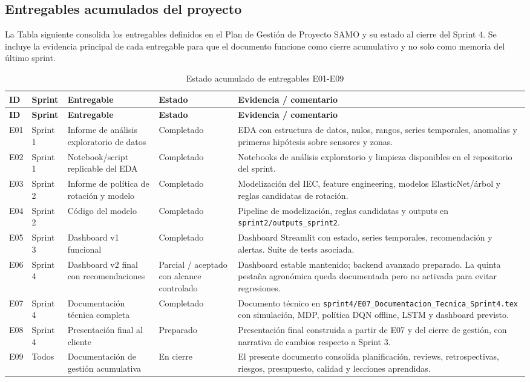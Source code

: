 \documentclass[11pt,a4paper]{article}
\begin{document}
\subsection{Entregables acumulados del proyecto}

La Tabla siguiente consolida los entregables definidos en el Plan de Gestión de Proyecto SAMO y su estado al cierre del Sprint 4. Se incluye la evidencia principal de cada entregable para que el documento funcione como cierre acumulativo y no solo como memoria del último sprint.

\begin{longtable}{p{}p{}p{}p{}p{}}
\caption{Estado acumulado de entregables E01-E09}\\
\toprule
\textbf{ID} & \textbf{Sprint} & \textbf{Entregable} & \textbf{Estado} & \textbf{Evidencia / comentario} \\
\midrule
\endfirsthead
\toprule
\textbf{ID} & \textbf{Sprint} & \textbf{Entregable} & \textbf{Estado} & \textbf{Evidencia / comentario} \\
\midrule
\endhead
E01 & Sprint 1 & Informe de análisis exploratorio de datos & Completado & EDA con estructura de datos, nulos, rangos, series temporales, anomalías y primeras hipótesis sobre sensores y zonas. \\
E02 & Sprint 1 & Notebook/script replicable del EDA & Completado & Notebooks de análisis exploratorio y limpieza disponibles en el repositorio del sprint. \\
E03 & Sprint 2 & Informe de política de rotación y modelo & Completado & Modelización del IEC, feature engineering, modelos ElasticNet/árbol y reglas candidatas de rotación. \\
E04 & Sprint 2 & Código del modelo & Completado & Pipeline de modelización, reglas candidatas y outputs en \texttt{sprint2/outputs\_sprint2}. \\
E05 & Sprint 3 & Dashboard v1 funcional & Completado & Dashboard Streamlit con estado, series temporales, recomendación y alertas. Suite de tests asociada. \\
E06 & Sprint 4 & Dashboard v2 final con recomendaciones & Parcial / aceptado con alcance controlado & Dashboard estable mantenido; backend avanzado preparado. La quinta pestaña agronómica queda documentada pero no activada para evitar regresiones. \\
E07 & Sprint 4 & Documentación técnica completa & Completado & Documento técnico en \texttt{sprint4/E07\_Documentacion\_Tecnica\_Sprint4.tex} con simulación, MDP, política DQN offline, LSTM y dashboard previsto. \\
E08 & Sprint 4 & Presentación final al cliente & Preparado & Presentación final construida a partir de E07 y del cierre de gestión, con narrativa de cambios respecto a Sprint 3. \\
E09 & Todos & Documentación de gestión acumulativa & En cierre & El presente documento consolida planificación, reviews, retrospectivas, riesgos, presupuesto, calidad y lecciones aprendidas. \\
\bottomrule
\end{longtable}
\end{document}
